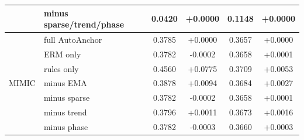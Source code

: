 \documentclass{article}
\newcommand{\method}{AutoAnchor}
\begin{document}
\begin{table}[t]
{\begin{tabular}{l|l|c|c|c|c}
& minus sparse/trend/phase & 0.0420 & +0.0000 & 0.1148 & +0.0000 \\
\midrule
\multirow{7}{*}{MIMIC} & full \method{} & 0.3785 & +0.0000 & 0.3657 & +0.0000 \\
& ERM only & 0.3782 & -0.0002 & 0.3658 & +0.0001 \\
& rules only & 0.4560 & +0.0775 & 0.3709 & +0.0053 \\
& minus EMA & 0.3878 & +0.0094 & 0.3684 & +0.0027 \\
& minus sparse & 0.3782 & -0.0002 & 0.3658 & +0.0001 \\
& minus trend & 0.3796 & +0.0011 & 0.3673 & +0.0016 \\
& minus phase & 0.3782 & -0.0003 & 0.3660 & +0.0003 \\
\bottomrule
\end{tabular}}
\end{table}
\end{document}
